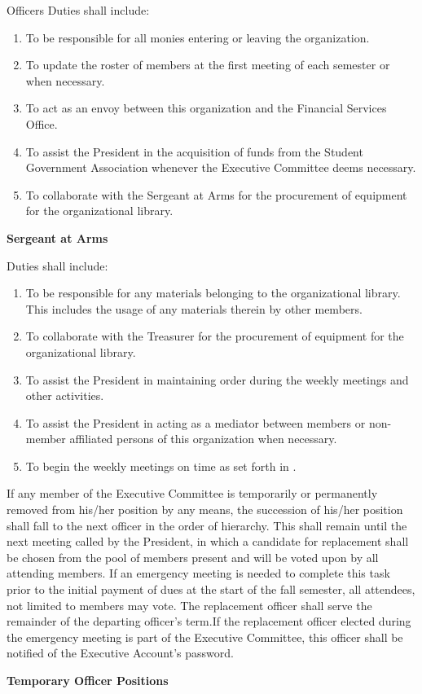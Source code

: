 {\begin{article}{Officers}
	Duties shall include:
	\begin{enumerate}
		\item To be responsible for all monies entering or leaving the organization.
		\item To update the roster of members at the first meeting of each semester or when necessary.
		\item To act as an envoy between this organization and the Financial Services Office.
		\item To assist the President in the acquisition of funds from the Student Government Association whenever the Executive Committee deems necessary.
		\item To collaborate with the Sergeant at Arms for the procurement of equipment for the organizational library.
	\end{enumerate}
	\item \textbf{Sergeant at Arms}

	Duties shall include:
	\begin{enumerate}
		\item To be responsible for any materials belonging to the organizational library. This includes the usage of any materials therein by other members.
		\item To collaborate with the Treasurer for the procurement of equipment for the organizational library.
		\item To assist the President in maintaining order during the weekly meetings and other activities.
		\item To assist the President in acting as a mediator between members or non-member affiliated persons of this organization when necessary.
		\item To begin the weekly meetings on time as set forth in .
	\end{enumerate}
	\item If any member of the Executive Committee is temporarily or permanently removed from his/her position by any means, the succession of his/her position shall fall to the next officer in the order of hierarchy.  This shall remain until the next meeting called by the President, in which a candidate for replacement shall be chosen from the pool of members present and will be voted upon by all attending members.  If an emergency meeting is needed to complete this task prior to the initial payment of dues at the start of the fall semester, all attendees, not limited to members may vote.  The replacement officer shall serve the remainder of the departing officer's term.If the replacement officer elected during the emergency meeting is part of the Executive Committee, this officer shall be notified of the Executive Account's password.
	\item \textbf{Temporary Officer Positions}


\end{article}}
